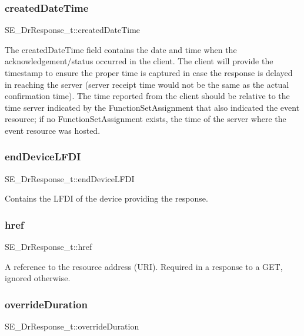 \subsubsection{\texorpdfstring{created\+Date\+Time}{createdDateTime}}
{\footnotesize\ttfamily S\+E\+\_\+\+Dr\+Response\+\_\+t\+::created\+Date\+Time}

The created\+Date\+Time field contains the date and time when the acknowledgement/status occurred in the client. The client will provide the timestamp to ensure the proper time is captured in case the response is delayed in reaching the server (server receipt time would not be the same as the actual confirmation time). The time reported from the client should be relative to the time server indicated by the Function\+Set\+Assignment that also indicated the event resource; if no Function\+Set\+Assignment exists, the time of the server where the event resource was hosted. \mbox{\label{group__DrResponse_ga71a72ff947c30daf23717299c9bec0b4}} 
\subsubsection{\texorpdfstring{end\+Device\+L\+F\+DI}{endDeviceLFDI}}
{\footnotesize\ttfamily S\+E\+\_\+\+Dr\+Response\+\_\+t\+::end\+Device\+L\+F\+DI}

Contains the L\+F\+DI of the device providing the response. \mbox{\label{group__DrResponse_gad93328683bc0ae7951dd64d6d9ef75d6}} 
\subsubsection{\texorpdfstring{href}{href}}
{\footnotesize\ttfamily S\+E\+\_\+\+Dr\+Response\+\_\+t\+::href}

A reference to the resource address (U\+RI). Required in a response to a G\+ET, ignored otherwise. \mbox{\label{group__DrResponse_ga0a4b25f83bac9e055e0842839953b1da}} 
\subsubsection{\texorpdfstring{override\+Duration}{overrideDuration}}
{\footnotesize\ttfamily S\+E\+\_\+\+Dr\+Response\+\_\+t\+::override\+Duration}

